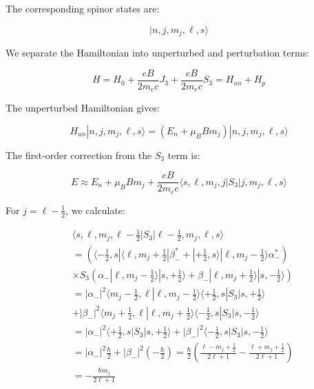 The corresponding spinor states are:

\begin{equation}
|n, j, m_j, \ell, s\rangle
\end{equation}

We separate the Hamiltonian into unperturbed and perturbation terms:

\begin{equation}
H=H_0+\frac{eB}{2m_e c}J_3+\frac{eB}{2m_e c}S_3=H_{un}+H_p
\end{equation}

The unperturbed Hamiltonian gives:

\begin{equation}
H_{un}|n, j, m_j, \ell, s\rangle=(E_n+\mu_B Bm_j)|n, j, m_j, \ell, s\rangle
\end{equation}

The first-order correction from the $S_3$ term is:

\begin{equation}
E \approx E_n+\mu_B Bm_j+\frac{eB}{2m_e c}\langle s,\ell,m_j,j|S_3|j,m_j,\ell,s\rangle
\end{equation}

For $j=\ell-\frac{1}{2}$, we calculate:

\begin{align}
&\langle s,\ell,m_j,\ell-\frac{1}{2}|S_3|\ell-\frac{1}{2},m_j,\ell,s\rangle\\
&=(\langle-\frac{1}{2},s|\langle\ell,m_j+\frac{1}{2}|\beta_-^*+|+\frac{1}{2},s\rangle|\ell,m_j-\frac{1}{2}\rangle\alpha_-^*)\\
&\times S_3(\alpha_-|\ell,m_j-\frac{1}{2}\rangle|s,+\frac{1}{2}\rangle+\beta_-|\ell,m_j+\frac{1}{2}\rangle|s,-\frac{1}{2}\rangle)\\
&=|\alpha_-|^2\langle m_j-\frac{1}{2},\ell|\ell,m_j-\frac{1}{2}\rangle\langle+\frac{1}{2},s|S_3|s,+\frac{1}{2}\rangle\\
&+|\beta_-|^2\langle m_j+\frac{1}{2},\ell|\ell,m_j+\frac{1}{2}\rangle\langle-\frac{1}{2},s|S_3|s,-\frac{1}{2}\rangle \\
&=|\alpha_-|^2\langle+\frac{1}{2},s|S_3|s,+\frac{1}{2}\rangle+|\beta_-|^2\langle-\frac{1}{2},s|S_3|s,-\frac{1}{2}\rangle\\
&=|\alpha_-|^2\frac{\hbar}{2}+|\beta_-|^2(-\frac{\hbar}{2})=\frac{\hbar}{2}\left(\frac{\ell-m_j+\frac{1}{2}}{2\ell+1}-\frac{\ell+m_j+\frac{1}{2}}{2\ell+1}\right)\\
&=-\frac{\hbar m_j}{2\ell+1}
\end{align}

